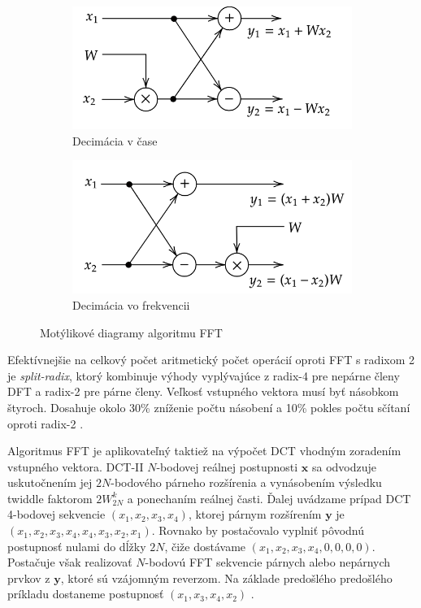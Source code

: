 \begin{figure}[h]
\centering
\begin{subfigure}[b]{0.48\textwidth}
    \centering
    \includegraphics[width=\textwidth]{figures/analysis/dit-butterfly.png}
    \caption{Decimácia v čase}
    \label{fig:dit-butterfly}
\end{subfigure}
\hfill
\begin{subfigure}[b]{0.48\textwidth}
    \centering
    \includegraphics[width=\textwidth]{figures/analysis/dif-butterfly.png}
    \caption{Decimácia vo frekvencii}
    \label{fig:dif-butterfly}
\end{subfigure}
\caption{Motýlikové diagramy algoritmu FFT}
\end{figure}

Efektívnejšie na celkový počet aritmetický počet operácií oproti FFT s radixom 2 je \emph{split-radix}, ktorý
kombinuje výhody vyplývajúce z radix-4 pre nepárne členy DFT a radix-2 pre párne členy. Veľkosť vstupného
vektora musí byť násobkom štyroch. Dosahuje okolo 30\% zníženie počtu násobení a 10\% pokles počtu sčítaní
oproti radix-2 \cite{split-radix}.

Algoritmus FFT je aplikovateľný taktiež na výpočet DCT vhodným zoradením vstupného vektora. DCT-II $N$-bodovej
reálnej postupnosti $\mathbf{x}$ sa odvodzuje uskutočnením jej $2N$-bodového párneho rozšírenia a vynásobením výsledku
twiddle faktorom $2W_{2N}^{k}$ a ponechaním reálnej časti. Ďalej uvádzame prípad
DCT 4-bodovej sekvencie $(x_1, x_2, x_3, x_4)$, ktorej párnym rozšírením $\mathbf{y}$ je
$(x_1, x_2, x_3, x_4, x_4, x_3, x_2, x_1)$.
Rovnako by postačovalo vyplniť pôvodnú postupnosť nulami do dĺžky $2N$, čiže dostávame $(x_1, x_2, x_3, x_4, 0, 0, 0, 0)$.
Postačuje však realizovať $N$-bodovú FFT sekvencie párnych alebo nepárnych prvkov z $\mathbf{y}$, ktoré sú vzájomným reverzom.
Na základe predošlého predošlého príkladu dostaneme postupnosť $(x_1, x_3, x_4, x_2)$ \cite{fast-dct}.

